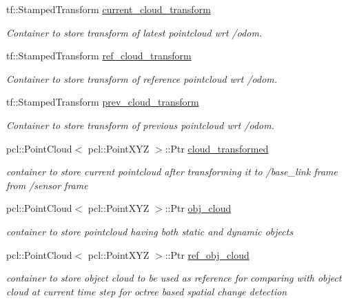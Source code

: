 \begin{DoxyCompactItemize}
tf\+::\+Stamped\+Transform \hyperlink{classdatmo_1_1cloud__segmentation_a2c01dc948f63510a421297e7cc6a29e5}{current\+\_\+cloud\+\_\+transform}
\begin{DoxyCompactList}\small\item\em Container to store transform of latest pointcloud wrt /odom. \end{DoxyCompactList}\item 
tf\+::\+Stamped\+Transform \hyperlink{classdatmo_1_1cloud__segmentation_a8ab8642656cda3d94db8d9c2e4613644}{ref\+\_\+cloud\+\_\+transform}
\begin{DoxyCompactList}\small\item\em Container to store transform of reference pointcloud wrt /odom. \end{DoxyCompactList}\item 
tf\+::\+Stamped\+Transform \hyperlink{classdatmo_1_1cloud__segmentation_af664f016cfef835a3cfc303675c0a5ec}{prev\+\_\+cloud\+\_\+transform}
\begin{DoxyCompactList}\small\item\em Container to store transform of previous pointcloud wrt /odom. \end{DoxyCompactList}\item 
pcl\+::\+Point\+Cloud$<$ pcl\+::\+Point\+X\+YZ $>$\+::Ptr \hyperlink{classdatmo_1_1cloud__segmentation_a00e99233257fe5a28a039eef13dbc65b}{cloud\+\_\+transformed}
\begin{DoxyCompactList}\small\item\em container to store current pointcloud after transforming it to /base\+\_\+link frame from /sensor frame \end{DoxyCompactList}\item 
pcl\+::\+Point\+Cloud$<$ pcl\+::\+Point\+X\+YZ $>$\+::Ptr \hyperlink{classdatmo_1_1cloud__segmentation_ad946a48ab59bf9f48338f9ef0702181c}{obj\+\_\+cloud}
\begin{DoxyCompactList}\small\item\em container to store pointcloud having both static and dynamic objects \end{DoxyCompactList}\item 
pcl\+::\+Point\+Cloud$<$ pcl\+::\+Point\+X\+YZ $>$\+::Ptr \hyperlink{classdatmo_1_1cloud__segmentation_a4f4926a401828fc5226665963a2212cf}{ref\+\_\+obj\+\_\+cloud}
\begin{DoxyCompactList}\small\item\em container to store object cloud to be used as reference for comparing with object cloud at current time step for octree based spatial change detection \end{DoxyCompactList}\item 

\end{DoxyCompactItemize}
